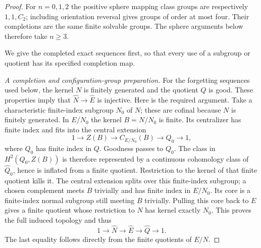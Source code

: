\begin{proof}
For $n=0,1,2$ the positive sphere mapping class groups are
respectively $1,1,C_2$; including orientation reversal gives
groups of order at most four. Their completions are the same
finite solvable groups. The sphere arguments below therefore
take $n\geq3$.

We give the completed exact sequences first, so that every use of
a subgroup or quotient has its specified completion map.

\emph{A completion and configuration-group preparation.}
For the forgetting sequences used below, the kernel $N$ is finitely
generated and the quotient $Q$ is good. These properties imply
that $\widehat N\to\widehat E$ is injective. Here is the required
argument. Take a characteristic finite-index subgroup $N_0$ of $N$;
these are cofinal because $N$ is finitely generated. In $E/N_0$ the
kernel $B=N/N_0$ is finite. Its centralizer has finite index and fits
into the central extension
\[
 1\longrightarrow Z(B)\longrightarrow C_{E/N_0}(B)
       \longrightarrow Q_0\longrightarrow1,
\]
where $Q_0$ has finite index in $Q$. Goodness passes to $Q_0$.
The class in $H^2(Q_0,Z(B))$ is therefore represented by a continuous
cohomology class of $\widehat Q_0$, hence is inflated from a finite
quotient. Restriction to the kernel of that finite quotient kills
it. The central extension splits over this finite-index subgroup;
a chosen complement meets $B$ trivially and has finite index in
$E/N_0$. Its core is a finite-index normal subgroup still meeting
$B$ trivially. Pulling this core back to $E$ gives a finite quotient
whose restriction to $N$ has kernel exactly $N_0$. This proves the
full induced topology and thus
\[
 1\longrightarrow\widehat N\longrightarrow\widehat E
       \longrightarrow\widehat Q\longrightarrow1.     \tag{D.31.2}
\]
The last equality follows directly from the finite quotients of
$E/N$.


\end{proof}
